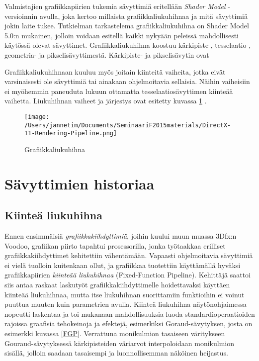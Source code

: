 \documentclass[finnish]{tktltiki2}
\theoremstyle{definition}
\theoremstyle{remark}
\begin{document}
Valmistajien grafiikkapiirien tukemia sävyttimiä eritellään \emph{Shader Model} -versioinnin avulla, joka kertoo millaista grafiikkaliukuhihnaa ja mitä sävyttimiä jokin laite tukee. Tutkielman tarkastelema grafiikkaliukuhihna on Shader Model 5.0:n mukainen, jolloin voidaan esitellä kaikki nykyään peleissä mahdollisesti käytössä olevat sävyttimet. Grafiikkaliukuhihna koostuu kärkipiste-, tesselaatio-, geometria- ja pikselisävyttimestä. Kärkipiste- ja pikselisävytin ovat 

Grafiikkaliukuhihnaan kuuluu myös joitain kiinteitä vaiheita, jotka eivät varsinaisesti ole sävyttimiä tai ainakaan ohjelmoitavia sellaisia. Näihin vaiheisiin ei myöhemmin paneuduta lukuun ottamatta tesselaatiosävyttimen kiinteää vaihetta. Liukuhihnan vaiheet ja järjestys ovat esitetty kuvassa \ref{gpipe} \cite{Mic11}.

\begin{figure}[!htb]
\centering
\texttt{[image: /Users/jannetim/Documents/SeminaariF2015materials/DirectX-11-Rendering-Pipeline.png]}
\caption{Grafiikkaliukuhihna}
\label{gpipe}
\end{figure}

\section{Sävyttimien historiaa}



\subsection{Kiinteä liukuhihna}

Ennen ensimmäisiä \emph{grafiikkakiihdyttimiä}, joihin kuului muun muassa 3Dfx:n Voodoo, grafiikan piirto tapahtui prosessorilla, jonka työtaakkaa erilliset grafiikkakiihdyttimet kehitettiin vähentämään. Vapaasti ohjelmoitavia sävyttimiä ei vielä tuolloin kuitenkaan ollut, ja grafiikkaa tuotettiin käyttämällä hyväksi grafiikkapiirien \emph{kiinteää liukuhihnaa} (Fixed-Function Pipeline). Kehittäjä saattoi siis antaa raskaat laskutyöt grafiikkakiihdyttimelle hoidettavaksi käyttäen kiinteää liukuhihnaa, mutta itse liukuhihnan suorittamiin funktioihin ei voinut puuttua muuten kuin parametrien avulla. Kiinteä liukuhihna näytönohjaimessa nopeutti laskentaa ja toi mukanaan mahdollisuuksia luoda standardioperaatioiden rajoissa graafisia tehokeinoja ja efektejä, esimerkiksi Goraud-sävytyksen, josta on esimerkki kuvassa \ref{FGP}. Verrattuna monikulmion tasaiseen väritykseen Gouraud-sävytyksessä kärkipisteiden väriarvot interpoloidaan monikulmion sisällä, jolloin saadaan tasaisempi ja luonnollisemman näköinen heijastus.
\end{document}

